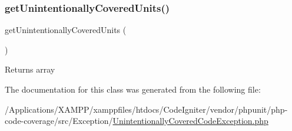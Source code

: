 \subsubsection{\texorpdfstring{get\+Unintentionally\+Covered\+Units()}{getUnintentionallyCoveredUnits()}}
{\footnotesize\ttfamily get\+Unintentionally\+Covered\+Units (\begin{DoxyParamCaption}{ }\end{DoxyParamCaption})}

\begin{DoxyReturn}{Returns}
array 
\end{DoxyReturn}


The documentation for this class was generated from the following file\+:\begin{DoxyCompactItemize}
\item 
/\+Applications/\+X\+A\+M\+P\+P/xamppfiles/htdocs/\+Code\+Igniter/vendor/phpunit/php-\/code-\/coverage/src/\+Exception/\mbox{\hyperlink{_unintentionally_covered_code_exception_8php}{Unintentionally\+Covered\+Code\+Exception.\+php}}\end{DoxyCompactItemize}
